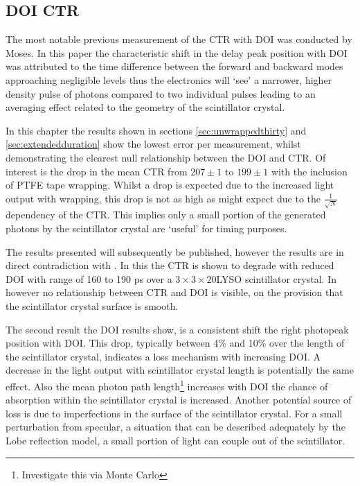 \subsection{DOI CTR}
The most notable previous measurement of the CTR with DOI was conducted by Moses\cite{Moses_Derenzo_1999}. In this paper the characteristic shift in the delay peak position with DOI was attributed to the time difference between the forward and backward modes approaching negligible levels thus the electronics will `see' a narrower, higher density pulse of photons compared to two individual pulses leading to an averaging effect related to the geometry of the scintillator crystal. 

In this chapter the results shown in sections \ref{sec:unwrappedthirty} and \ref{sec:extendedduration} show the lowest error per measurement, whilst demonstrating the clearest null relationship between the DOI and CTR.  Of interest is the drop in the mean CTR from $207\pm1$ to $199\pm1$ with the inclusion of PTFE tape wrapping. Whilst a drop is expected due to the increased light output with wrapping, this drop is not as high as might expect due to the $\frac{1}{\sqrt{N}}$ dependency of the CTR. This implies only a small portion of the generated photons by the scintillator crystal are `useful' for timing purposes.

The results presented will subsequently be published, however the results are in direct contradiction with \cite{Yeom2013}. In this the CTR is shown to degrade with reduced DOI with range of 160 to 190 ps over a $3\times3\times20$\mmc LYSO scintillator crystal. In \cite{Bircher2012} however no relationship between CTR and DOI is visible, on the provision that the scintillator crystal surface is smooth.

The second result the DOI results show, is a consistent shift the right photopeak position with DOI. This drop, typically between 4\% and 10\% over the length of the scintillator crystal, indicates a loss mechanism with increasing DOI. A decrease in the light output with scintillator crystal length\cite{Moszyixki1997} is potentially the same effect. Also the mean photon path length\footnote{Investigate this via Monte Carlo} increases with DOI the chance of absorption within the scintillator crystal is increased. Another potential source of loss is due to imperfections in the surface of the scintillator crystal. For a small perturbation from specular, a situation that can be described adequately by the Lobe reflection model\cite{Janecek2010a}, a small portion of light can couple out of the scintillator.